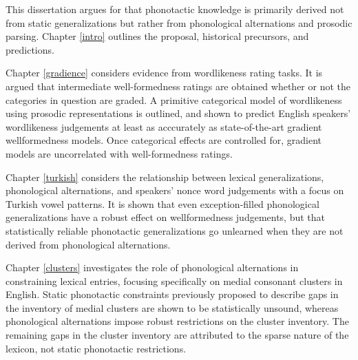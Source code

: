 This dissertation argues for that phonotactic knowledge is primarily derived not from static generalizations but rather from phonological alternations and prosodic parsing. Chapter \ref{intro} outlines the proposal, historical precursors, and predictions. 

Chapter \ref{gradience} considers evidence from wordlikeness rating tasks. It is argued that intermediate well-formedness ratings are obtained whether or not the categories in question are graded. A primitive categorical model of wordlikeness using prosodic representations is outlined, and shown to predict English speakers' wordlikeness judgements at least as acccurately as state-of-the-art gradient wellformedness models. Once categorical effects are controlled for, gradient models are uncorrelated with well-formedness ratings.

Chapter \ref{turkish} considers the relationship between lexical generalizations, phonological alternations, and speakers' nonce word judgements with a focus on Turkish vowel patterns. It is shown that even exception-filled phonological generalizations have a robust effect on wellformedness judgements, but that statistically reliable phonotactic generalizations go unlearned when they are not derived from phonological alternations.

Chapter \ref{clusters} investigates the role of phonological alternations in constraining lexical entries, focusing specifically on medial consonant clusters in English. Static phonotactic constraints previously proposed to describe gaps in the inventory of medial clusters are shown to be statistically unsound, whereas phonological alternations impose robust restrictions on the cluster inventory. The remaining gaps in the cluster inventory are attributed to the sparse nature of the lexicon, not static phonotactic restrictions.
